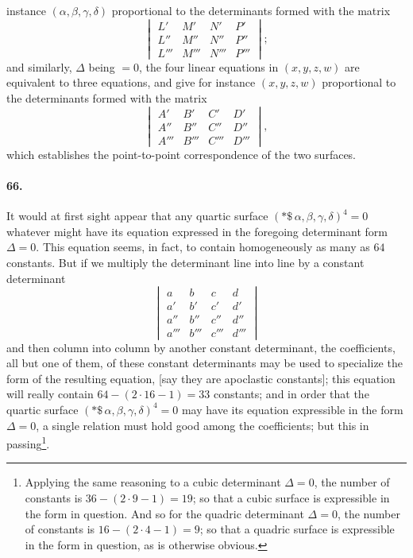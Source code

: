 \documentclass[11pt,a4paper]{article}
\begin{document}
instance $(\alpha, \beta, \gamma, \delta)$ proportional to the determinants formed
with the matrix
\[
\begin{vmatrix} L' & M' & N' & P'\\ L'' & M'' & N'' & P''\\
L''' & M''' & N''' & P''' \end{vmatrix};
\]
and similarly, $\Delta$ being $= 0$, the four linear equations in $(x, y, z, w)$ are
equivalent to three equations, and give for instance $(x, y, z, w)$ proportional to
the determinants formed with the matrix
\[
\begin{vmatrix} A' & B' & C' & D'\\ A'' & B'' & C'' & D''\\
A''' & B''' & C''' & D''' \end{vmatrix},
\]
which establishes the point-to-point correspondence of the two surfaces.

\medskip

\paragraph{66.}
It would at first sight appear that any quartic surface
$(*\$\,\alpha, \beta, \gamma, \delta)^4 = 0$ whatever might have its equation
expressed in the foregoing determinant form $\Delta = 0$. This equation seems, in
fact, to contain homogeneously as many as $64$ constants. But if we multiply the
determinant line into line by a constant determinant
\[
\begin{vmatrix} a & b & c & d\\ a' & b' & c' & d'\\
a'' & b'' & c'' & d''\\ a''' & b''' & c''' & d''' \end{vmatrix}
\]
and then column into column by another constant determinant, the coefficients, all
but one of them, of these constant determinants may be used to specialize the form
of the resulting equation, [say they are apoclastic constants]; this equation will
really contain $64 - (2 \cdot 16 - 1) = 33$ constants; and in order that the quartic
surface $(*\$\,\alpha, \beta, \gamma, \delta)^4 = 0$ may have its equation
expressible in the form $\Delta = 0$, a single relation must hold good among the
coefficients; but this in passing\footnote{Applying the same reasoning to a cubic
determinant $\Delta = 0$, the number of constants is $36 - (2 \cdot 9 - 1) = 19$;
so that a cubic surface is expressible in the form in question. And so for the
quadric determinant $\Delta = 0$, the number of constants is $16 - (2 \cdot 4 - 1)
= 9$; so that a quadric surface is expressible in the form in question, as is
otherwise obvious.}.
\end{document}
